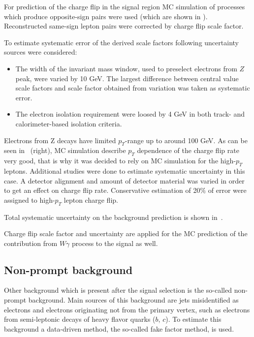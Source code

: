 For prediction of the charge flip in the signal region MC simulation of processes which produce opposite-sign pairs
were used (which are shown in ). Reconstructed same-sign lepton pairs were corrected by 
charge flip scale factor.

To estimate systematic error of the derived scale factors following uncertainty sources were considered:
\begin{itemize}
 \item The width of the invariant mass window, used to preselect electrons from $Z$ peak, were varied by 10 GeV.
 The largest difference between central value scale factors and scale factor obtained from variation was taken as systematic error.
 \item The electron isolation requirement were loosed by 4 GeV in both track- and calorimeter-based isolation criteria.
\end{itemize}
Electrons from Z decays have limited $p_T$-range up to around 100 GeV. As can be seen in~ (right), 
MC simulation describe $p_T$ dependence of the charge flip rate very good, that is why it was decided to rely on MC simulation 
for the high-$p_T$ leptons. Additional studies were done to estimate systematic uncertainty in this case.
A detector alignment and amount of detector material was varied in order to get an effect on charge flip rate.
Conservative estimation of 20$\%$ of error were assigned to high-$p_T$ lepton charge flip.

Total systematic uncertainty on the background prediction is shown in~.

Charge flip scale factor and uncertainty are applied for the MC prediction of the contribution from $W\gamma$ process to the signal as well.

\subsection{Non-prompt background}

Other background which is present after the signal selection is the so-called non-prompt background.
Main sources of this background are jets misidentified as electrons and electrons originating not from 
the primary vertex, such as electrons from semi-leptonic decays of heavy flavor quarks ($b$, $c$).
To estimate this background a data-driven method, the so-called fake factor method, is used.

